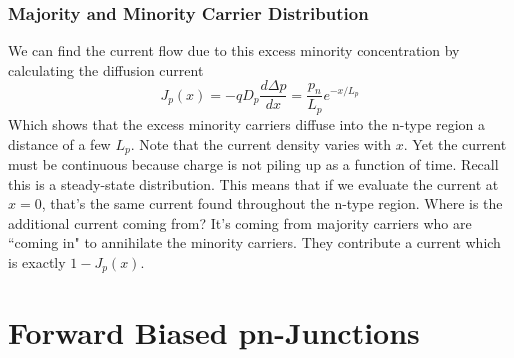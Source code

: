\subsubsection*{Majority and Minority Carrier Distribution}
We can find the current flow due to this excess minority concentration by calculating the diffusion current
    \begin{equation}
        J_p(x) = -q D_p \frac{d \Delta p}{dx} = \frac{p_n}{L_p} e^{-x/L_p} 
    \end{equation}	
Which shows that the excess minority carriers diffuse into the n-type region a distance of a few $L_p$.  Note that the current density varies with $x$.  Yet the current must be continuous because charge is not piling up as a function of time.  Recall this is a steady-state distribution.  This means that if we evaluate the current at $x = 0$, that's the same current found throughout the n-type region. 
Where is the additional current coming from?  It's coming from majority carriers who are ``coming in" to annihilate the minority carriers.  They contribute a current which is exactly $1- J_p(x)$.  
\section{Forward Biased pn-Junctions}
